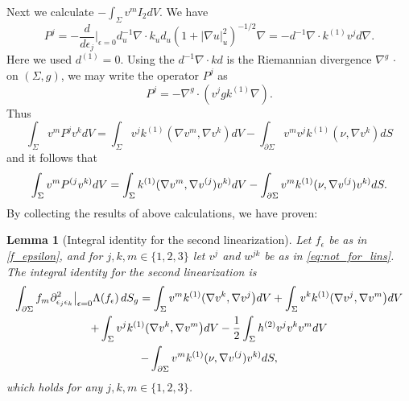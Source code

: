 \documentclass[12pt]{amsart}
\def\p{\partial}
\newtheorem{lemma}[theorem]{Lemma}
\theoremstyle{definition}
\theoremstyle{remark}
\newcommand{\abs}[1]{\lvert #1 \rvert}
\newcommand{\eps}{\epsilon}
\newcommand{\s}{\hspace{0.5pt}}
\newcommand{\ccdot}{\,\cdot\,}
\begin{document}
Next we calculate  $-\int_\Sigma v^mI_2dV $. We have
\begin{equation*}%
 P^j=-\frac{d}{d\eps_j}\Big|_{\eps=0}d_u^{-1}\nabla\cdot k_ud_u(1+\abs{\nabla u}^2_u)^{-1/2}\nabla =-d^{-1}\nabla\cdot k^{(1)}v^jd\nabla.
\end{equation*}
Here we used $d^{(1)}=0$. Using the $d^{-1}\nabla\cdot k d$ is the Riemannian divergence $\nabla^g\ccdot$ on $(\Sigma,g)$, we may write the operator $P^{j}$ as
\begin{equation}\label{eq:formula_for_Pj}
 P^j=-\nabla^g\cdot (v^jgk^{(1)}\nabla).
\end{equation}
%
Thus 
\begin{equation*}
 \int_\Sigma v^m P^jv^kdV%
 =\int_\Sigma v^jk^{(1)}(\nabla v^m,\nabla v^k)dV - \int_{\p \Sigma} v^mv^j k^{(1)}(\nu,\nabla v^k)dS
\end{equation*}
and it follows that 
\begin{equation*}%
 \int_\Sigma v^m P^{(j}v^{k)}dV
 =\int_\Sigma k^{(1)}(\nabla v^m,\nabla v^{(j})v^{k)}dV \\
 - \int_{\p \Sigma} v^m k^{(1)}(\nu,\nabla v^{(j})v^{k)}dS. 
\end{equation*}
By collecting the results of above calculations, we have proven:
\begin{lemma}[Integral identity for the second linearization]\label{Lem:Integral identity_2nd} Let $f_\eps$ be as in \eqref{f_epsilon}, and for $j,k,m\in \{1,2,3\}$ let $v^{j}$ and $w^{jk}$ be as in \eqref{eq:not_for_lins}.
	The integral identity for the second linearization is
	\begin{multline}\label{eq:second_integral_id}
	 \int_{\p \Sigma} f_m \s \p^2_{\eps_j \eps_k}\big|_{\epsilon=0} \Lambda (f_\epsilon) \, dS_g =\int_{\Sigma} v^m k^{(1)}(\nabla v^k,\nabla v^j\big)dV+\int_{\Sigma}v^k k^{(1)}(\nabla v^j,\nabla v^m\big)dV\\
 +\int_{\Sigma} v^j k^{(1)}(\nabla v^k,\nabla v^m\big)dV -\frac{1}{2}\int_{\Sigma} h^{(2)}v^jv^kv^mdV  \\
 - \int_{\p \Sigma} v^m k^{(1)}(\nu,\nabla v^{(j})v^{k)}dS,
	\end{multline}
	which holds for any $j,k,m\in \{1,2,3\}$.
\end{lemma}
\end{document}
